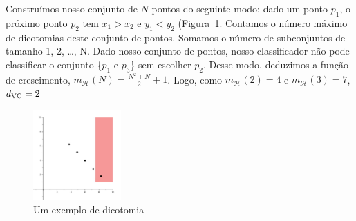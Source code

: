     Construímos nosso conjunto de $N$ pontos do seguinte modo: dado um ponto $p_1$, o próximo ponto $p_2$ tem $x_1 > x_2$ e $y_1 < y_2$ (Figura~\ref{fig:ex15b}. Contamos o número máximo de dicotomias deste conjunto de pontos. Somamos o número de subconjuntos de tamanho 1, 2, \ldots, N. Dado nosso conjunto de pontos, nosso classificador não pode classificar o conjunto \{$p_1$ e $p_3$\} sem escolher $p_2$. Desse modo, deduzimos a função de crescimento, $m_{\mathcal{H}}(N) = \frac{N^2+N}{2}+1$. Logo, como $m_{\mathcal{H}}(2)=4$ e $m_{\mathcal{H}}(3)=7$, $d_{\text{VC}}=2$
    \begin{figure}[h]
	    \includegraphics[width=0.3\textwidth]{ex15b}
	    \caption{Um exemplo de dicotomia}
	    \label{fig:ex15b}
    \end{figure}



